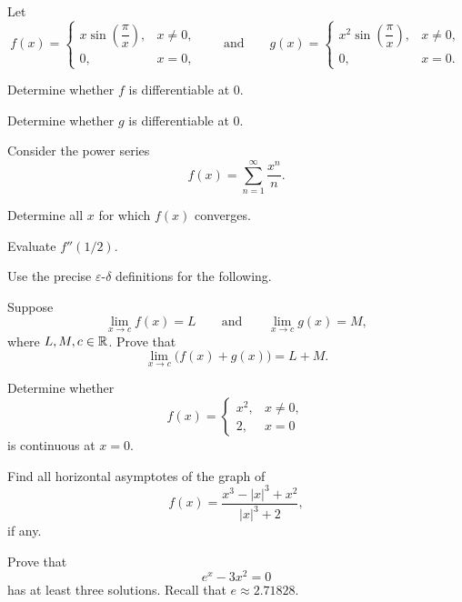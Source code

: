 \begin{problem}
Let
\[
f(x)=
\begin{cases}
x\sin\!\left(\dfrac{\pi}{x}\right), & x\ne0,\\[0.5em]
0, & x=0,
\end{cases}
\qquad
\text{and}
\qquad
g(x)=
\begin{cases}
x^2\sin\!\left(\dfrac{\pi}{x}\right), & x\ne0,\\[0.5em]
0, & x=0.
\end{cases}
\]
\begin{problemsubparts}
\item Determine whether $f$ is differentiable at $0$.
\item Determine whether $g$ is differentiable at $0$.
\end{problemsubparts}
\end{problem}

\begin{problem}
Consider the power series
\[
f(x)=\sum_{n=1}^{\infty}\frac{x^n}{n}.
\]
\begin{problemsubparts}
\item Determine all $x$ for which $f(x)$ converges.
\item Evaluate $f''(1/2)$.
\end{problemsubparts}
\end{problem}


\begin{problem}
Use the precise $\varepsilon$-$\delta$ definitions for the following.
\begin{problemsubparts}
\item Suppose
\[
\lim_{x\to c}f(x)=L
\qquad\text{and}\qquad
\lim_{x\to c}g(x)=M,
\]
where $L,M,c\in\mathbb{R}$. Prove that
\[
\lim_{x\to c}\bigl(f(x)+g(x)\bigr)=L+M.
\]
\item Determine whether
\[
f(x)=
\begin{cases}
x^2, & x\ne0,\\
2, & x=0
\end{cases}
\]
is continuous at $x=0$.
\end{problemsubparts}
\end{problem}

\begin{problem}
\begin{problemsubparts}
\item Find all horizontal asymptotes of the graph of
\[
f(x)=\frac{x^3-|x|^3+x^2}{|x|^3+2},
\]
if any.
\item Prove that
\[
e^x-3x^2=0
\]
has at least three solutions. Recall that $e\approx2.71828$.
\end{problemsubparts}
\end{problem}

